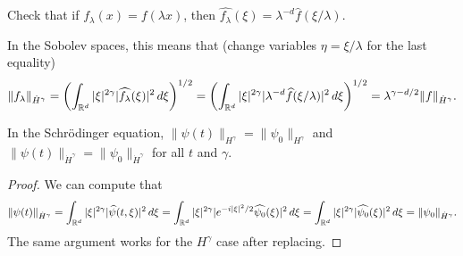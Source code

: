 \begin{exercise}
  Check that if $f_\lambda(x) = f(\lambda x)$, then
  $\widehat{f_\lambda}(\xi) = \lambda^{-d} \widehat{f}(\xi / \lambda)$.
\end{exercise}

\begin{remark}
  In the Sobolev spaces, this means that (change
  variables $\eta = \xi / \lambda$ for the last equality)
  \[
    \|f_\lambda\|_{\dot{H}^{\gamma}}
    = \left(\int_{\mathbb{R}^d} |\xi|^{2\gamma} |\widehat{f_\lambda}(\xi)|^2\, d\xi\right)^{1 / 2}
    = \left(\int_{\mathbb{R}^d} |\xi|^{2\gamma} |\lambda^{-d} \widehat{f}(\xi / \lambda)|^2\, d\xi\right)^{1 / 2}
    = \lambda^{\gamma - d / 2} \|f\|_{\dot{H}^{\gamma}}.
  \]
\end{remark}

\begin{lemma}
  In the Schr\"odinger equation, $\|\psi(t)\|_{H^{\gamma}} = \|\psi_0\|_{H^{\gamma}}$
  and $\|\psi(t)\|_{\dot{H}^{\gamma}} = \|\psi_0\|_{\dot{H}^{\gamma}}$
  for all $t$ and $\gamma$.
\end{lemma}

\begin{proof}
  We can compute that
  \[
    \|\psi(t)\|_{\dot{H}^{\gamma}}
    = \int_{\mathbb{R}^d} |\xi|^{2\gamma} |\widehat{\psi}(t, \xi)|^2\, d\xi
    = \int_{\mathbb{R}^d} |\xi|^{2\gamma} |e^{-i |\xi|^2 / 2}\widehat{\psi_0}(\xi)|^2\, d\xi
    = \int_{\mathbb{R}^d} |\xi|^{2\gamma} |\widehat{\psi_0}(\xi)|^2\, d\xi
    = \|\psi_0\|_{\dot{H}^{\gamma}}.
  \]
  The same argument works for the $H^{\gamma}$ case
  after replacing.
\end{proof}

